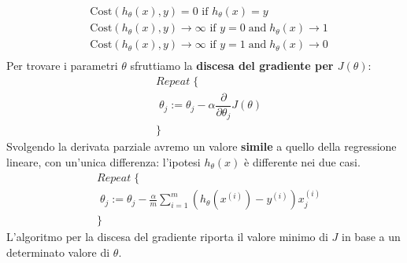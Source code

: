 \begin{align*}& \mathrm{Cost}(h_\theta(x),y) = 0 \text{ if } h_\theta(x) = y \\ & \mathrm{Cost}(h_\theta(x),y) \rightarrow \infty \text{ if } y = 0 \; \mathrm{and} \; h_\theta(x) \rightarrow 1 \\ & \mathrm{Cost}(h_\theta(x),y) \rightarrow \infty \text{ if } y = 1 \; \mathrm{and} \; h_\theta(x) \rightarrow 0 \\ \end{align*}
Per trovare i parametri $\theta$ sfruttiamo la \textbf{discesa del gradiente per $J(\theta)$}:
\begin{align*}& Repeat \; \lbrace \\ & \; \theta_j := \theta_j - \alpha \dfrac{\partial}{\partial \theta_j}J(\theta) \\ & \rbrace\end{align*}
Svolgendo la derivata parziale avremo un valore \textbf{simile} a quello della regressione lineare, con un'unica differenza: l'ipotesi $h_\theta(x)$ è differente nei due casi.
\begin{align*} & Repeat \; \lbrace \\ & \; \theta_j := \theta_j - \frac{\alpha}{m} \sum_{i=1}^m (h_\theta(x^{(i)}) - y^{(i)}) x_j^{(i)} \\ & \rbrace \end{align*}
L'algoritmo per la discesa del gradiente riporta il valore minimo di $J$ in base a un determinato valore di $\theta$.
